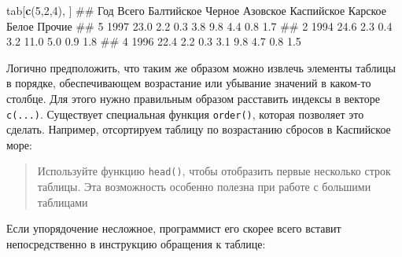 \documentclass[]{book}
\newenvironment{Shaded}{\begin{snugshade}}{\end{snugshade}}
\newcommand{\KeywordTok}[1]{\textcolor[rgb]{0.13,0.29,0.53}{\textbf{#1}}}
\newcommand{\DecValTok}[1]{\textcolor[rgb]{0.00,0.00,0.81}{#1}}
\newcommand{\OperatorTok}[1]{\textcolor[rgb]{0.81,0.36,0.00}{\textbf{#1}}}
\newcommand{\NormalTok}[1]{#1}
\begin{document}
\begin{Shaded}
\begin{Highlighting}[]
\NormalTok{tab[}\KeywordTok{c}\NormalTok{(}\DecValTok{5}\NormalTok{,}\DecValTok{2}\NormalTok{,}\DecValTok{4}\NormalTok{), ]}
\NormalTok{##    Год Всего Балтийское Черное Азовское Каспийское Карское Белое Прочие}
\NormalTok{## 5 1997  23.0        2.2    0.3      3.8        9.8     4.4   0.8    1.7}
\NormalTok{## 2 1994  24.6        2.3    0.4      3.2       11.0     5.0   0.9    1.8}
\NormalTok{## 4 1996  22.4        2.2    0.3      3.1        9.8     4.7   0.8    1.5}
\end{Highlighting}
\end{Shaded}

Логично предположить, что таким же образом можно извлечь элементы
таблицы в порядке, обеспечивающем возрастание или убывание значений в
каком-то столбце. Для этого нужно правильным образом расставить индексы
в векторе \texttt{c(...)}. Существует специальная функция
\texttt{order()}, которая позволяет это сделать. Например, отсортируем
таблицу по возрастанию сбросов в Каспийское море:

\begin{Shaded}
\end{Shaded}

\begin{quote}
Используйте функцию \texttt{head()}, чтобы отобразить первые несколько
строк таблицы. Эта возможность особенно полезна при работе с большими
таблицами
\end{quote}

Если упорядочение несложное, программист его скорее всего вставит
непосредственно в инструкцию обращения к таблице:
\end{document}
